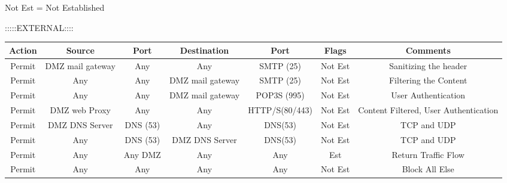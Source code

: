 \documentclass[12pt]{article}
\begin{document}
\begin{description}
    \vspace{180pt}
    
    Not Est = Not Established 
    
    :::::EXTERNAL::::
    \begin{center}
    \fontsize{8}{12}\selectfont
      \begin{tabular}{|c|c|c|c|c|c|c|}
        \hline
        \textbf{Action} & \textbf{Source} & \textbf{Port} & \textbf{Destination} & \textbf{Port} & \textbf{Flags} & \textbf{Comments} \\
        \hline
        Permit & DMZ mail gateway & Any & Any & SMTP (25) & Not Est & Sanitizing the header \\
        Permit & Any & Any & DMZ mail gateway & SMTP (25) & Not Est & Filtering the Content \\
        Permit & Any & Any & DMZ mail gateway & POP3S (995) & Not Est &User Authentication\\
        Permit & DMZ web Proxy & Any & Any & HTTP/S(80/443) & Not Est & Content Filtered, User Authentication\\
        Permit & DMZ DNS Server & DNS (53) & Any & DNS(53) & Not Est & TCP and UDP \\
        Permit & Any & DNS (53) & DMZ DNS Server & DNS(53) & Not Est & TCP and UDP \\
        Permit & Any & Any DMZ  & Any & Any & Est & Return Traffic Flow \\
        Permit & Any & Any & Any & Any & Not Est & Block All Else \\
        \hline
      \end{tabular}
    \end{center} \par
    

\end{description}
\end{document}
